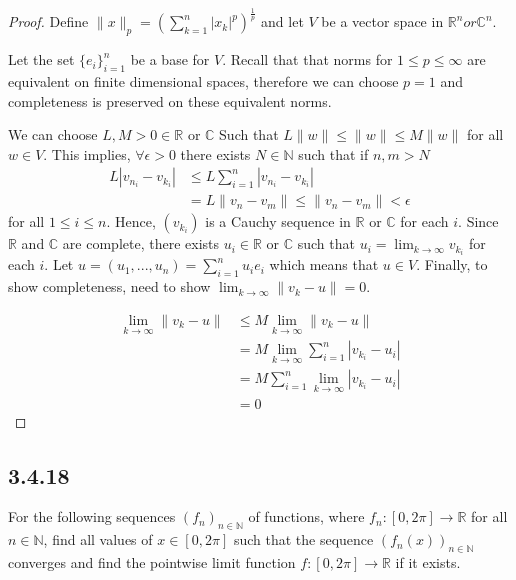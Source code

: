 \documentclass{tufte-book}
\theoremstyle{mytheoremstyle}
\theoremstyle{mylemstyle}
\theoremstyle{mydefstyle}
\begin{document}
\begin{proof}
Define $\|x\|_p = (\sum_{k=1}^n |x_k|^p)^\frac{1}{p}$ and let $V$ be a vector space in $\mathbb{R}^n or \mathbb{C}^n$.

Let the set $\{e_i\}_{i=1}^n$ be a base for $V$.  Recall that that norms for $1 \leq p \leq \infty$ are equivalent on finite dimensional spaces, therefore we can choose $p=1$ and completeness is preserved on these equivalent norms.

We can choose $L,M>0 \in \mathbb{R}$ or $\mathbb{C}$ Such that $L\|w\| \leq \|w\| \leq M\|w\|$ for all $w \in V$.  This implies, $\forall \epsilon >0$ there exists $N \in \mathbb{N}$ such that if $n,m > N$
\begin{align*}
L|v_{n_{i}} - v_{k_{i}}| &\leq L \sum_{i=1}^n|v_{n_{i}} - v_{k_{i}}|\\
&= L\|v_n - v_m\| \leq \|v_n - v_m\|< \epsilon
\end{align*}
for all $1 \leq i \leq n$.  Hence, $(v_{k_{i}})$ is a Cauchy sequence in $\mathbb{R}$ or $\mathbb{C}$ for each $i$.  Since $\mathbb{R}$ and $\mathbb{C}$ are complete, there exists $u_i \in \mathbb{R}$ or $\mathbb{C}$ such that $u_i = \lim_{k \to \infty}v_{k_{i}}$ for each $i$.
Let $u=(u_1,...,u_n) = \sum_{i=1}^n u_ie_i$ which means that $u \in V$.  Finally, to show completeness, need to show $\lim_{k \to \infty}\|v_k - u\| = 0$.

\begin{align*}
\lim_{k \to \infty}\|v_k - u\| &\leq M \lim_{k \to \infty}\|v_k - u\|\\
&= M \lim_{k \to \infty} \sum_{i=1}^n|v_{k_{i}} - u_i| \\
&= M \sum_{i=1}^n \lim_{k \to \infty} |v_{k_{i}} - u_i| \\
&= 0
\end{align*}

\end{proof}

\subsection{3.4.18}
For the following sequences $(f_n)_{n \in \mathbb{N}}$ of functions, where $f_n:[0,2\pi] \rightarrow \mathbb{R}$ for all $n \in \mathbb{N}$, find all values of $x \in [0, 2\pi]$ such that the sequence $(f_n(x))_{n \in \mathbb{N}}$ converges and find the pointwise limit function $f: [0,2\pi] \rightarrow \mathbb{R}$ if it exists.
\end{document}
